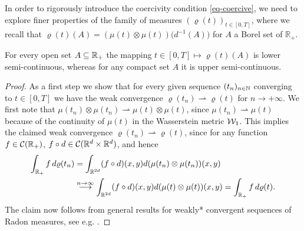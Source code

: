 In order to rigorously introduce the coercivity condition \eqref{eq-coercive}, we need to explore finer properties of the family of measures $(\varrho(t))_{t \in [0,T]}$, where we recall that 
$\varrho(t)(A)=(\mu(t)\otimes\mu(t))\bigl(d^{-1}(A)\bigr)$ for $A$ a Borel set of $\mathbb{R}_+$.

\begin{lemma}\label{rhosc}
	For every open set $A\subseteq\mathbb{R}_+$ the mapping $t \in [0,T] \mapsto\varrho(t)(A)$ is lower semi-continuous, whereas for
	any compact set $A$ it is upper semi-continuous.
\end{lemma}

\begin{proof}As a first step we show that for every given sequence $(t_n)_{n \in \mathbb{N}}$ converging to $t\in [0,T]$ we have the weak
	convergence $\varrho(t_n)\rightharpoonup\varrho(t)$ for $n \rightarrow +\infty$. 
	We first note that $\mu(t_n)\otimes\mu(t_n)\rightharpoonup\mu(t)\otimes\mu(t)$, since $\mu(t_n)\rightharpoonup\mu(t)$ because of the continuity of $\mu(t)$ in the Wasserstein metric $\mathcal{W}_1$.	
%	
	This implies the claimed weak convergence $\varrho(t_n)\rightharpoonup\varrho(t)$, since for any
	function $f\in \mathcal{C}(\mathbb{R}_+)$, $f\circ d\in\mathcal{C}(\mathbb{R}^d\times\mathbb{R}^d)$, and hence
	\begin{align*}
		\int_{\mathbb{R}_+}f\,d\varrho(t_n)
			&=\int_{\mathbb{R}^{2d}}(f\circ d)(x,y)d(\mu(t_n)\otimes\mu(t_n))(x,y)\\
			&\stackrel{n\rightarrow\infty}{\longrightarrow}
				\int_{\mathbb{R}^{2d}}(f\circ d)(x,y)d(\mu(t)\otimes\mu(t))(x,y)
			=\int_{\mathbb{R}_+}f\,d\varrho(t).
	\end{align*}
	The claim now follows from general results for weakly* convergent sequences of Radon measures, see e.g. \cite[Proposition 1.62]{AFP00}.
\end{proof}

